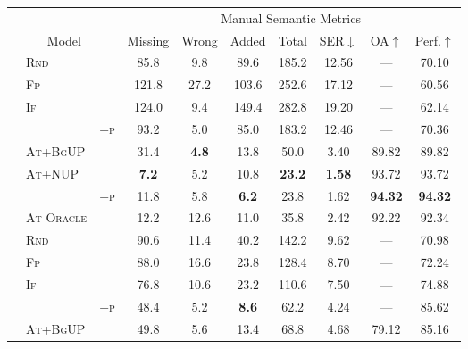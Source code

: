 \begin{table*}[t!]

\begin{tabular}{lll c c c c  c c c}
\toprule
 & & &  \multicolumn{7}{c}{Manual Semantic Metrics} \\
\cmidrule(lr){4-10} 
\multicolumn{3}{c}{Model} &  Missing &  Wrong & Added & Total & SER$\downarrow$ & OA$\uparrow$ & Perf.$\uparrow$\\
\midrule
\parbox[t]{2mm}{}
&\textsc{Rnd} & &85.8&9.8&89.6&185.2&12.56&---&70.10 \\
&\textsc{Fp} & &121.8&27.2&103.6&252.6&17.12&---&60.56 \\
&\textsc{If} & &124.0&9.4&149.4&282.8&19.20&---&62.14 \\
&  & \textsc{+p}&93.2&5.0&85.0&183.2&12.46&---&70.36 \\
&\textsc{At+BgUP} & &31.4&\textbf{  4.8}&13.8&50.0&3.40&89.82&89.82 \\
&\textsc{At+NUP} & &\textbf{  7.2}&5.2&10.8&\textbf{ 23.2}&\textbf{ 1.58}&93.72&93.72 \\
&  & \textsc{+p}&11.8&5.8&\textbf{  6.2}&23.8&1.62&\textbf{94.32}&\textbf{94.32} \\
&\textsc{At Oracle} & &12.2&12.6&11.0&35.8&2.42&92.22&92.34 \\
\midrule
\parbox[t]{2mm}{}
&\textsc{Rnd} & &90.6&11.4&40.2&142.2&9.62&---&70.98 \\
&\textsc{Fp} & &88.0&16.6&23.8&128.4&8.70&---&72.24 \\
&\textsc{If} & &76.8&10.6&23.2&110.6&7.50&---&74.88 \\
&  & \textsc{+p}&48.4&5.2&\textbf{  8.6}&62.2&4.24&---&85.62 \\
&\textsc{At+BgUP} & &49.8&5.6&13.4&68.8&4.68&79.12&85.16 \\

\end{tabular}
\end{table*}
